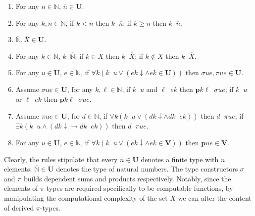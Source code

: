 \documentclass[preprint]{elsarticle}
\theoremstyle{plain}
\DeclareMathOperator{\din}{\dot{\in}}
\DeclareMathOperator{\dnin}{\dot{\not\in}}
\begin{document}
\begin{enumerate}
  \item[$0$.] For any $n \in \mathbb{N}$, $\overline{n} \in \mathbf{U}$.

  \item[$0'$.] For any $k, n \in \mathbb{N}$, if $k < n$ then $k \din \overline{n}$; if $k \geq n$ then $k \dnin \overline{n}$.

  \item[$1$.] $\overline{\mathbb{N}}, \overline{X} \in \mathbf{U}$.

  \item[$1'$.] For any $k \in \mathbb{N}$, $k \din \overline{\mathbb{N}}$; if $k \in X$ then $k \din \overline{X}$; if $k \not\in X$ then $k \dnin \overline{X}$.

  \item[$2,3$.] For any $u \in \mathbf{U}$, $e \in \mathbb{N}$, if $\forall k \left(k \dnin u \lor \left(ek {\downarrow} \land ek \in \mathbf{U}\right)\right)$ then $\sigma ue, \pi ue \in \mathbf{U}$.

  \item[$2'$.] Assume $\sigma ue \in \mathbf{U}$, for any $k, \ell \in \mathbb{N}$, if $k \din u$ and $\ell \din ek$ then $\mathbf{p}k \ell \din \sigma ue$; if $k \dnin u$ or $ \ell \dnin ek$ then $\mathbf{p}k \ell \dnin \sigma ue$.

  \item[$3'$.] Assume $\pi ue \in \mathbf{U}$, for $d \in \mathbb{N}$, if $\forall k \left(k \dnin u \lor \left(dk {\downarrow} \land dk \din ek\right)\right)$ then $d \din \pi ue$; if $\exists k \left(k \din u \land \left(dk {\downarrow} \rightarrow dk \dnin ek\right)\right)$ then $d \dnin \pi ue$.

  \item[$4$.] For any $u \in \mathbf{U}$, $e \in \mathbb{N}$, if $\forall k \left(k \dnin u \lor \left(ek {\downarrow} \land ek \in \mathbf{V}\right)\right)$ then $\mathbf{p}ue \in \mathbf{V}$.
\end{enumerate}

Clearly, the rules stipulate that every $\overline{n} \in \mathbf{U}$ denotes a finite type with $n$ elements; $\overline{\mathbb{N}} \in \mathbf{U}$ denotes the type of natural numbers. The type constructors $\sigma$ and $\pi$ builds dependent sums and products respectively. Notably, since the elements of $\pi$-types are required specifically to be computable functions, by manipulating the computational complexity of the set $X$ we can alter the content of derived $\pi$-types.
\end{document}
